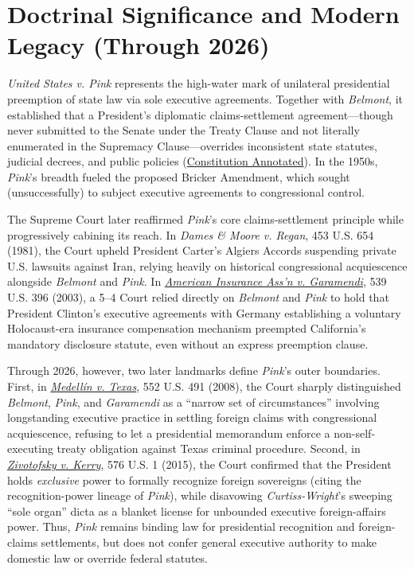 \documentclass[12pt]{article}
\begin{document}
\section{Doctrinal Significance and Modern Legacy (Through 2026)}
\textit{United States v. Pink} represents the high-water mark of unilateral presidential preemption of state law via sole executive agreements. Together with \textit{Belmont}, it established that a President's diplomatic claims-settlement agreement---though never submitted to the Senate under the Treaty Clause and not literally enumerated in the Supremacy Clause---overrides inconsistent state statutes, judicial decrees, and public policies (\href{https://www.law.cornell.edu/constitution-conan/article-2/section-2/clause-2/legal-effect-of-executive-agreements}{Constitution Annotated}). In the 1950s, \textit{Pink}'s breadth fueled the proposed Bricker Amendment, which sought (unsuccessfully) to subject executive agreements to congressional control.

The Supreme Court later reaffirmed \textit{Pink}'s core claims-settlement principle while progressively cabining its reach. In \textit{Dames \& Moore v. Regan}, 453 U.S. 654 (1981), the Court upheld President Carter's Algiers Accords suspending private U.S. lawsuits against Iran, relying heavily on historical congressional acquiescence alongside \textit{Belmont} and \textit{Pink}. In \href{https://supreme.justia.com/cases/federal/us/539/396/}{\textit{American Insurance Ass'n v. Garamendi}}, 539 U.S. 396 (2003), a 5--4 Court relied directly on \textit{Belmont} and \textit{Pink} to hold that President Clinton's executive agreements with Germany establishing a voluntary Holocaust-era insurance compensation mechanism preempted California's mandatory disclosure statute, even without an express preemption clause.

Through 2026, however, two later landmarks define \textit{Pink}'s outer boundaries. First, in \href{https://supreme.justia.com/cases/federal/us/552/491/}{\textit{Medell\'in v. Texas}}, 552 U.S. 491 (2008), the Court sharply distinguished \textit{Belmont}, \textit{Pink}, and \textit{Garamendi} as a ``narrow set of circumstances'' involving longstanding executive practice in settling foreign claims with congressional acquiescence, refusing to let a presidential memorandum enforce a non-self-executing treaty obligation against Texas criminal procedure. Second, in \href{https://supreme.justia.com/cases/federal/us/576/1/}{\textit{Zivotofsky v. Kerry}}, 576 U.S. 1 (2015), the Court confirmed that the President holds \emph{exclusive} power to formally recognize foreign sovereigns (citing the recognition-power lineage of \textit{Pink}), while disavowing \textit{Curtiss-Wright}'s sweeping ``sole organ'' dicta as a blanket license for unbounded executive foreign-affairs power. Thus, \textit{Pink} remains binding law for presidential recognition and foreign-claims settlements, but does not confer general executive authority to make domestic law or override federal statutes.
\end{document}
